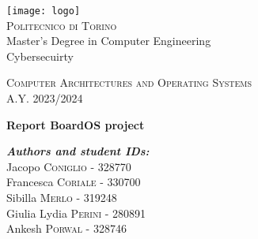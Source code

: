 \documentclass[a4paper,11pt]{report}
\begin{document}
	\begin{titlepage}
		\begin{center}
            \vspace*{-3cm}
	
		\texttt{[image: logo]}~\\[0.8cm]
		
		\textsc{\LARGE Politecnico di Torino}\\[0.5cm]
		
		\Large Master's Degree in Computer Engineering\\
        \Large Cybersecuirty\\[0.1cm]
        \vspace*{1.2cm}
	
		\textsc{\Large Computer Architectures and Operating Systems}\\[0.8cm]
        \large A.Y. 2023/2024\\[0.1cm]
		\vspace*{1.5cm}
			
		{ \LARGE \bfseries Report BoardOS project\\[2.5cm] }

		\noindent
		\begin{minipage}[t]{0.9\textwidth}
			\begin{flushright} \large
				\emph{\textbf{Authors and student IDs:}}\\
	            Jacopo \textsc{Coniglio} - 328770\\
                Francesca \textsc{Coriale} - 330700\\
                Sibilla \textsc{Merlo} - 319248\\
                Giulia Lydia \textsc{Perini} - 280891\\
                Ankesh \textsc{Porwal} - 328746\\
			\end{flushright}
		\end{minipage}
        \end{center}
    \end{titlepage}


    
    \addtocounter{page}{-1} %
	\tableofcontents
    \thispagestyle{empty}
	\newpage


\end{document}
